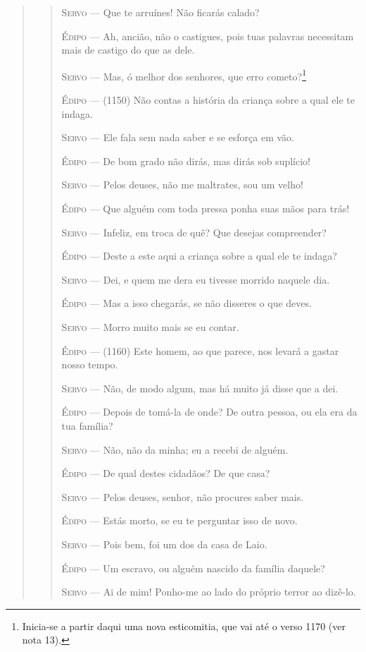 \begin{verse}
\begin{verse}
\textsc{Servo} --- Que te arruínes! Não ficarás calado?

\textsc{Édipo} --- Ah, ancião, não o castigues, pois tuas palavras necessitam mais de
castigo do que as dele.

\textsc{Servo} --- Mas, ó melhor dos senhores, que erro cometo?\footnote{Inicia-se a partir daqui uma nova esticomitia,
  que vai até o verso 1170 (ver nota 13).}

\textsc{Édipo} --- (1150) Não contas a história da criança sobre a qual ele te indaga.

\textsc{Servo} --- Ele fala sem nada saber e se esforça em vão.

\textsc{Édipo} --- De bom grado não dirás, mas dirás sob suplício!

\textsc{Servo} --- Pelos deuses, não me maltrates, sou um velho!

\textsc{Édipo} --- Que alguém com toda pressa ponha suas mãos para trás!

\textsc{Servo} --- Infeliz, em troca de quê? Que desejas compreender?

\textsc{Édipo} --- Deste a este aqui a criança sobre a qual ele te indaga?

\textsc{Servo} --- Dei, e quem me dera eu tivesse morrido naquele dia.

\textsc{Édipo} --- Mas a isso chegarás, se não disseres o que deves.

\textsc{Servo} --- Morro muito mais se eu contar.

\textsc{Édipo} --- (1160) Este homem, ao que parece, nos levará a gastar nosso tempo.

\textsc{Servo} --- Não, de modo algum, mas há muito já disse que a dei.

\textsc{Édipo} --- Depois de tomá-la de onde? De outra pessoa, ou ela era da tua família?

\textsc{Servo} --- Não, não da minha; eu a recebi de alguém.

\textsc{Édipo} --- De qual destes cidadãos? De que casa?

\textsc{Servo} --- Pelos deuses, senhor, não procures saber mais.

\textsc{Édipo} --- Estás morto, se eu te perguntar isso de novo.

\textsc{Servo} --- Pois bem, foi um dos da casa de Laio.

\textsc{Édipo} --- Um escravo, ou alguém nascido da família daquele?

\textsc{Servo} --- Ai de mim! Ponho-me ao lado do próprio terror ao dizê-lo.


\end{verse}
\end{verse}
